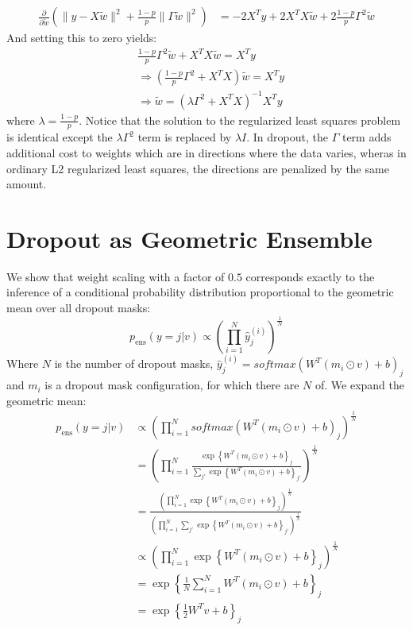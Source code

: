 \documentclass[paper=a4, fontsize=11pt]{scrartcl} %
\numberwithin{equation}{section} %
\numberwithin{figure}{section} %
\numberwithin{table}{section} %
\newcommand{\dP}[2]{\frac{\partial #1}{\partial #2}}
\begin{document}
\begin{enumerate}[(a)]
	\begin{align*}
		\dP{}{\tilde{w}}\left( \| y-X\tilde{w}\|^2 + \frac{1-p}{p} \|\Gamma \tilde{w}\|^2\right) &= -2X^Ty + 2X^TX\tilde{w} + 2\frac{1-p}{p}\Gamma^2\tilde{w}
	\end{align*}
	And setting this to zero yields:
	\begin{align*}
		&\frac{1-p}{p}\Gamma^2\tilde{w} + X^TX\tilde{w} =  X^Ty\\
		&\Rightarrow  \left(\frac{1-p}{p}\Gamma^2 + X^TX\right)\tilde{w} = X^Ty\\
		&\Rightarrow \tilde{w} = \left(\lambda\Gamma^2 + X^TX\right)^{-1}X^Ty
	\end{align*}
	where $\lambda=\frac{1-p}{p}$. Notice that the solution to the regularized least squares problem is identical except the $\lambda\Gamma^2$ term is replaced by $\lambda I$. In dropout, the $\Gamma$ term adds additional cost to weights which are in directions where the data varies, wheras in ordinary L2 regularized least squares, the directions are penalized by the same amount.
\end{enumerate}

\section{Dropout as Geometric Ensemble}

We show that weight scaling with a factor of $0.5$ corresponds exactly to the inference of a conditional probability distribution proportional to the geometric mean over all dropout masks:
$$ p_{\text{ens}}(y=j|v) \propto \left( \prod_{i=1}^N \hat{y}_j^{(i)} \right)^{\frac{1}{N}} $$
Where $N$ is the number of dropout masks, $\hat{y}_j^{(i)}=softmax\left(W^T(m_i\odot v)+b\right)_j$ and $m_i$ is a dropout mask configuration, for which there are $N$ of. We expand the geometric mean:
\begin{align*}
p_{\text{ens}}(y=j|v) &\propto \left( \prod_{i=1}^N softmax\left(W^T(m_i\odot v)+b\right)_j\right)^{\frac{1}{N}}\\
&= \left(\prod_{i=1}^N \frac{\exp\left\{W^T(m_i\odot v)+b\right\}_j}{\sum_{j'}\exp\left\{W^T(m_i\odot v)+b\right\}_{j'}}\right)^\frac{1}{N}\\
&= \frac{\left(\prod_{i=1}^N \exp\left\{W^T(m_i\odot v)+b\right\}_j \right)^{\frac{1}{N}}}{\left(\prod_{i=1}^N\sum_{j'}\exp\left\{W^T(m_i\odot v)+b\right\}_{j'}\right)^{\frac{1}{N}}}\\
&\propto \left(\prod_{i=1}^N \exp\left\{W^T(m_i\odot v)+b\right\}_j \right)^{\frac{1}{N}}\\
&=\exp\left\{\frac{1}{N}\sum_{i=1}^N W^T(m_i\odot v)+b\right\}_j\\
&=\exp\left\{\frac{1}{2}W^Tv+b\right\}_j
\end{align*}
\end{document}
